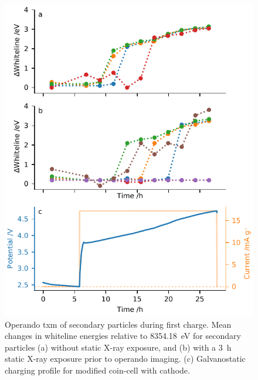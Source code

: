 \documentclass{article}
\begin{document}
\begin{figure}
  \begin{center}
    \includegraphics{figures/NCA-particles-irradiation.pdf}
  \end{center}
  \caption{Operando \gls{txm} of secondary \nca{} particles during
    first charge. Mean changes in whiteline energies relative to
    \SI{8354.18}{eV} for secondary particles (a) without static X-ray
    exposure, and (b) with a \SI{3}{\hour} static X-ray exposure prior
    to operando imaging. (c) Galvanostatic charging profile for
    modified coin-cell with \nca{} cathode.}
  \label{fig:nca-irradiation}
\end{figure}
\end{document}
